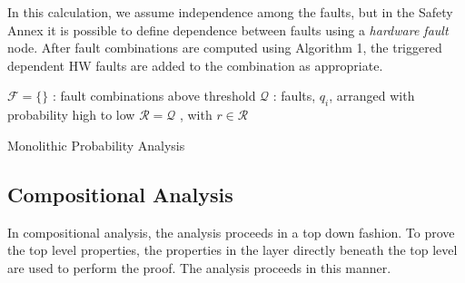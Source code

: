 In this calculation, we assume independence among the faults, but in the Safety Annex it is possible to define dependence between faults using a \textit{hardware fault} node. After fault combinations are computed using Algorithm 1, the triggered dependent HW faults are added to the combination as appropriate. 

\begin{algorithm}[H]
	$\mathcal{F} = \{\}$ : fault combinations above threshold \;
	$\mathcal{Q}$ : faults, $q_i$, arranged with probability high to low \;
	$\mathcal{R} = \mathcal{Q}$ , with $r \in \mathcal{R}$\;
	\caption{Monolithic Probability Analysis}
\end{algorithm}




\subsection{Compositional Analysis}
In compositional analysis, the analysis proceeds in a top down fashion. To prove the top level properties, the properties in the layer directly beneath the top level are used to perform the proof. The analysis proceeds in this manner.

